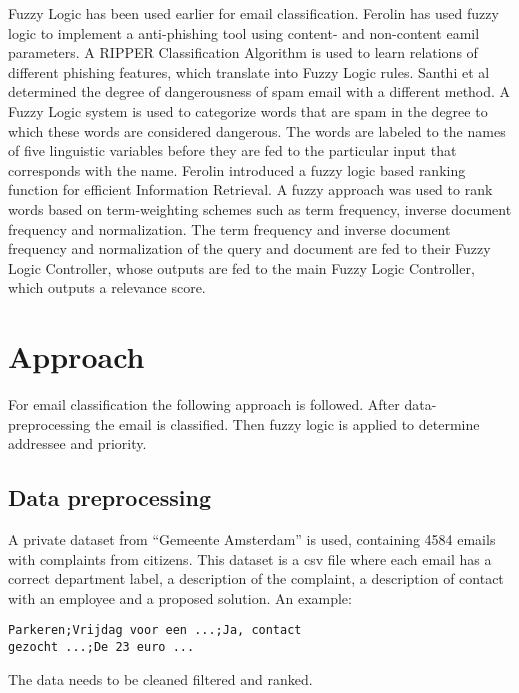 \documentclass[journal]{IEEEtran}
\begin{document}
Fuzzy Logic has been used earlier for email classification. Ferolin \cite{phishing} 
has used fuzzy logic to implement a anti-phishing tool using content- and non-content eamil parameters. A RIPPER Classification Algorithm is used to learn relations of different phishing features, which translate into Fuzzy Logic rules. Santhi et al \cite{spam} determined the degree of dangerousness of spam email with a different method. A Fuzzy Logic system is used to categorize words that are spam in the degree to which these words are considered dangerous. The words are labeled to the names of five linguistic variables before they are fed to the particular input that corresponds with the name. Ferolin \cite{ranking} introduced a fuzzy logic based ranking function for efficient Information Retrieval. A fuzzy approach was used to rank words based on term-weighting schemes such as term frequency, inverse document frequency and normalization. The term frequency and inverse document frequency and normalization of the query and document are fed to their Fuzzy Logic Controller, whose outputs are fed to the main Fuzzy Logic Controller, which outputs a relevance score.

\section{Approach}
For email classification the following approach is followed. After data-preprocessing the email is classified. Then fuzzy logic is applied to determine addressee and priority. 

\subsection{Data preprocessing}
A private dataset from ``Gemeente Amsterdam'' is used, containing 4584 emails with complaints from citizens. 
This dataset is a csv file where each email has a correct department label, a description of the complaint, a description of contact with an employee and a proposed solution.
An example:
\begin{lstlisting}
Parkeren;Vrijdag voor een ...;Ja, contact 
gezocht ...;De 23 euro ...
\end{lstlisting}

The data needs to be cleaned filtered and ranked.
\end{document}
